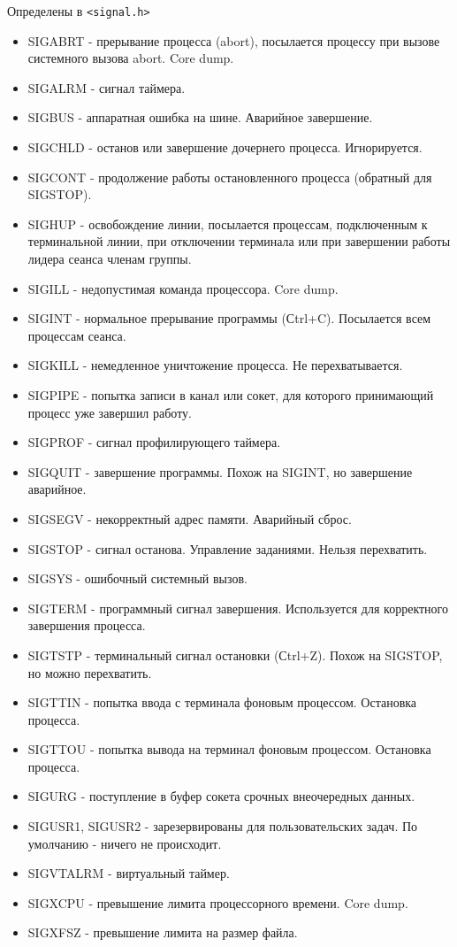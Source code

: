 Определены в \verb+<signal.h>+
\begin{itemize}
\item SIGABRT - прерывание процесса (abort), посылается процессу при вызове системного вызова abort. Core dump.
\item SIGALRM - сигнал таймера.
\item SIGBUS - аппаратная ошибка на шине. Аварийное завершение.
\item SIGCHLD - останов или завершение дочернего процесса. Игнорируется.
\item SIGCONT - продолжение работы остановленного процесса (обратный для SIGSTOP).
\item SIGHUP - освобождение линии, посылается процессам, подключенным к терминальной линии, при отключении терминала или при завершении работы лидера сеанса членам группы.
\item SIGILL - недопустимая команда процессора. Core dump.
\item SIGINT - нормальное прерывание программы (Сtrl+C). Посылается всем процессам сеанса.
\item SIGKILL - немедленное уничтожение процесса. Не перехватывается.
\item SIGPIPE - попытка записи в канал или сокет, для которого принимающий процесс уже завершил работу.
\item SIGPROF - сигнал профилирующего таймера.
\item SIGQUIT - завершение программы. Похож на SIGINT, но завершение аварийное.
\item SIGSEGV - некорректный адрес памяти. Аварийный сброс.
\item SIGSTOP - сигнал останова. Управление заданиями. Нельзя перехватить.
\item SIGSYS - ошибочный системный вызов.
\item SIGTERM - программный сигнал завершения. Используется для корректного завершения процесса.
\item SIGTSTP - терминальный сигнал остановки (Сtrl+Z). Похож на SIGSTOP, но можно перехватить.
\item SIGTTIN - попытка ввода с терминала фоновым процессом. Остановка процесса.
\item SIGTTOU - попытка вывода на терминал фоновым процессом. Остановка процесса.
\item SIGURG - поступление в буфер сокета срочных внеочередных данных.
\item SIGUSR1, SIGUSR2 - зарезервированы для пользовательских задач. По умолчанию - ничего не происходит.
\item SIGVTALRM - виртуальный таймер.
\item SIGXCPU - превышение лимита процессорного времени. Core dump.
\item SIGXFSZ - превышение лимита на размер файла.
\end{itemize}
            
